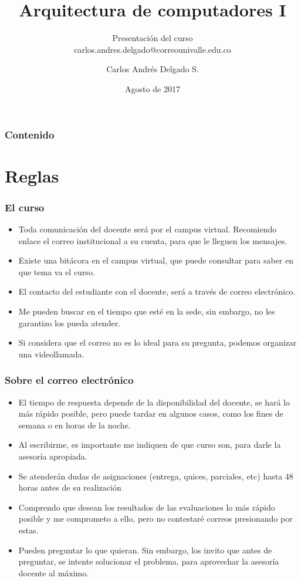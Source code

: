 \documentclass{beamer}
\author{Carlos Andr\'es Delgado S.}
\title{Arquitectura de computadores I}
\subtitle{Presentación del curso \\ carlos.andres.delgado@correounivalle.edu.co}
\institute{Facultad de Ingeniería. Universidad del Valle}
\date{Agosto de 2017}
\begin{document}
	\begin{frame}
		\titlepage	 		
	\end{frame}
	\begin{frame}
 		\frametitle{Contenido}
		\tableofcontents
	\end{frame}
	

	\section{Reglas}
	\begin{frame}
		\frametitle{El curso}
		\begin{itemize}
			\item Toda comunicación del docente será por el campus virtual. Recomiendo enlace el correo institucional a su cuenta, para que le lleguen los mensajes.
			\item Existe una bitácora en el campus virtual, que puede consultar para saber en que tema va el curso.
			\item El contacto del estudiante con el docente, será a través de correo electrónico.
			\item Me pueden buscar en el tiempo que esté en la sede, sin embargo, no les garantizo los pueda atender.
			\item Si considera que el correo no es lo ideal para su pregunta, podemos organizar una videollamada.
		\end{itemize}
	\end{frame}	
	
	\begin{frame}
		\frametitle{Sobre el correo electrónico}
		\begin{itemize}
			\item El tiempo de respuesta depende de la disponibilidad del docente, se hará lo más rápido posible, pero puede tardar en algunos casos, como los fines de semana o en horas de la noche.
			\item Al escribirme, es importante me indiquen de que curso son, para darle la asesoría apropiada.
			\item Se atenderán dudas de asignaciones (entrega, quices, parciales, etc) hasta 48 horas antes de su realización
			\item Comprendo que desean los resultados de las evaluaciones lo más rápido posible y me comprometo a ello, pero no contestaré correos presionando por estas.
			\item Pueden preguntar lo que quieran. Sin embargo, los invito que antes de preguntar, se intente solucionar el problema, para aprovechar la asesoría docente al máximo.
		\end{itemize}
	\end{frame}	
\end{document}
